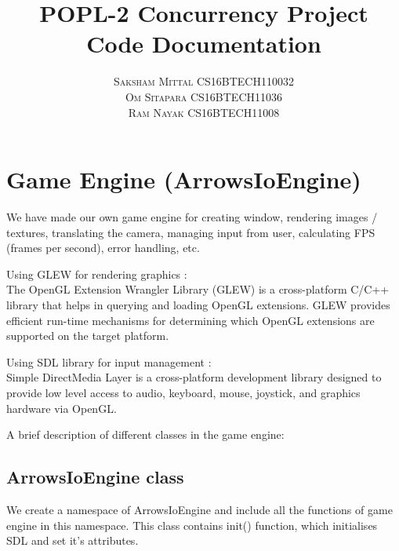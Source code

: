 \documentclass{article}
\begin{document}
\title
{\Huge \textbf{POPL-2 Concurrency Project}\\ 
\huge Code Documentation }
\author{\textsc{Saksham Mittal CS16BTECH110032} \\ 
\textsc{Om Sitapara CS16BTECH11036} \\
\textsc{Ram Nayak CS16BTECH11008} \\}

\maketitle
\vspace{350px}

\tableofcontents{}
\vspace{400px}

\section{Game Engine (ArrowsIoEngine)}
We have made our own game engine for creating window, rendering images / textures, translating the camera, managing input from user, calculating FPS (frames per second), error handling, etc. \newline

Using GLEW for rendering graphics : \\
The OpenGL Extension Wrangler Library (GLEW) is a cross-platform C/C++ library that helps in querying and loading OpenGL extensions. GLEW provides efficient run-time mechanisms for determining which OpenGL extensions are supported on the target platform. \newline

Using SDL library for input management : \\
Simple DirectMedia Layer is a cross-platform development library designed to provide low level access to audio, keyboard, mouse, joystick, and graphics hardware via OpenGL.
\newline

A brief description of different classes in the game engine:


\subsection{ArrowsIoEngine class}
We create a namespace of ArrowsIoEngine and include all the functions of game engine in this namespace. This class contains init() function, which initialises SDL and set it’s attributes. \newline
\end{document}
